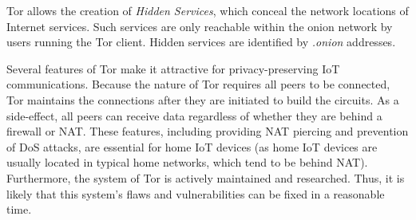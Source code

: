 Tor allows the creation of \textit{Hidden Services}, which conceal the network locations of Internet services. Such services are only reachable within the onion network by users running the Tor client. Hidden services are identified by \textit{.onion} addresses.

Several features of Tor make it attractive for privacy-preserving IoT communications. Because the nature of Tor requires all peers to be connected, Tor maintains the connections after they are initiated to build the circuits. As a side-effect, all peers can receive data regardless of whether they are behind a firewall or NAT. These features, including providing NAT piercing and prevention of DoS attacks, are essential for home IoT devices (as home IoT devices are usually located in typical home networks, which tend to be behind NAT). Furthermore, the system of Tor is actively maintained and researched. Thus, it is likely that this system's flaws and vulnerabilities can be fixed in a reasonable time. 

